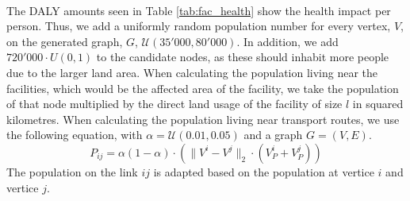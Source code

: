 \documentclass[mscthesis, 11pt]{usiinfthesis}
\theoremstyle{newdefinition}
\begin{document}
\\
The DALY amounts seen in Table \ref{tab:fac_health} show the health impact per person. Thus, we add a uniformly random population number for every vertex, $V$, on the generated graph, $G$, $\mathcal{U}(35'000, 80'000)$. In addition, we add $720'000 \cdot U(0, 1)$ to the candidate nodes, as these should inhabit more people due to the larger land area. When calculating the population living near the facilities, which would be the affected area of the facility, we take the population of that node multiplied by the direct land usage of the facility of size $l$ in squared kilometres.
When calculating the population living near transport routes, we use the following equation, with $\alpha = \mathcal{U}(0.01, 0.05)$ and a graph $G = (V, E)$.
\begin{equation}
    P_{ij} = \alpha(1 - \alpha) \cdot (\lVert V^i - V^j \rVert_2 \cdot (V^i_{P} + V^j_{P}))
\end{equation}
The population on the link $ij$ is adapted based on the population at vertice $i$ and vertice $j$.
\begin{table}[ht]
\centering
{}
\caption{Direct and indirect land use impacts (Taken from \cite[~p.~8]{olapiriyakul_multiobjective_2019})}
\label{tab:my-landuse}
\end{table}
\end{document}
